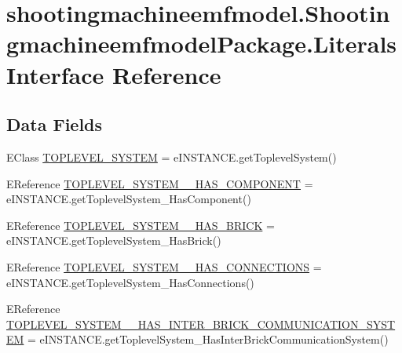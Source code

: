 \hypertarget{interfaceshootingmachineemfmodel_1_1_shootingmachineemfmodel_package_1_1_literals}{\section{shootingmachineemfmodel.\-Shootingmachineemfmodel\-Package.\-Literals Interface Reference}
\label{interfaceshootingmachineemfmodel_1_1_shootingmachineemfmodel_package_1_1_literals}
}
\subsection*{Data Fields}
\begin{DoxyCompactItemize}
\item 
E\-Class \hyperlink{interfaceshootingmachineemfmodel_1_1_shootingmachineemfmodel_package_1_1_literals_a943e2666e6ae22cc7e941dcdfbd58760}{T\-O\-P\-L\-E\-V\-E\-L\-\_\-\-S\-Y\-S\-T\-E\-M} = e\-I\-N\-S\-T\-A\-N\-C\-E.\-get\-Toplevel\-System()
\item 
E\-Reference \hyperlink{interfaceshootingmachineemfmodel_1_1_shootingmachineemfmodel_package_1_1_literals_a3c539f9755873f3092e11475859a829a}{T\-O\-P\-L\-E\-V\-E\-L\-\_\-\-S\-Y\-S\-T\-E\-M\-\_\-\-\_\-\-H\-A\-S\-\_\-\-C\-O\-M\-P\-O\-N\-E\-N\-T} = e\-I\-N\-S\-T\-A\-N\-C\-E.\-get\-Toplevel\-System\-\_\-\-Has\-Component()
\item 
E\-Reference \hyperlink{interfaceshootingmachineemfmodel_1_1_shootingmachineemfmodel_package_1_1_literals_aaeba17ff3572f5fbff404d80a6d180bc}{T\-O\-P\-L\-E\-V\-E\-L\-\_\-\-S\-Y\-S\-T\-E\-M\-\_\-\-\_\-\-H\-A\-S\-\_\-\-B\-R\-I\-C\-K} = e\-I\-N\-S\-T\-A\-N\-C\-E.\-get\-Toplevel\-System\-\_\-\-Has\-Brick()
\item 
E\-Reference \hyperlink{interfaceshootingmachineemfmodel_1_1_shootingmachineemfmodel_package_1_1_literals_ae77f38b845fa6d099f8f0da6530e21df}{T\-O\-P\-L\-E\-V\-E\-L\-\_\-\-S\-Y\-S\-T\-E\-M\-\_\-\-\_\-\-H\-A\-S\-\_\-\-C\-O\-N\-N\-E\-C\-T\-I\-O\-N\-S} = e\-I\-N\-S\-T\-A\-N\-C\-E.\-get\-Toplevel\-System\-\_\-\-Has\-Connections()
\item 
E\-Reference \hyperlink{interfaceshootingmachineemfmodel_1_1_shootingmachineemfmodel_package_1_1_literals_a84278af2736b8a20be3c3f573a19a6dc}{T\-O\-P\-L\-E\-V\-E\-L\-\_\-\-S\-Y\-S\-T\-E\-M\-\_\-\-\_\-\-H\-A\-S\-\_\-\-I\-N\-T\-E\-R\-\_\-\-B\-R\-I\-C\-K\-\_\-\-C\-O\-M\-M\-U\-N\-I\-C\-A\-T\-I\-O\-N\-\_\-\-S\-Y\-S\-T\-E\-M} = e\-I\-N\-S\-T\-A\-N\-C\-E.\-get\-Toplevel\-System\-\_\-\-Has\-Inter\-Brick\-Communication\-System()

\end{DoxyCompactItemize}
